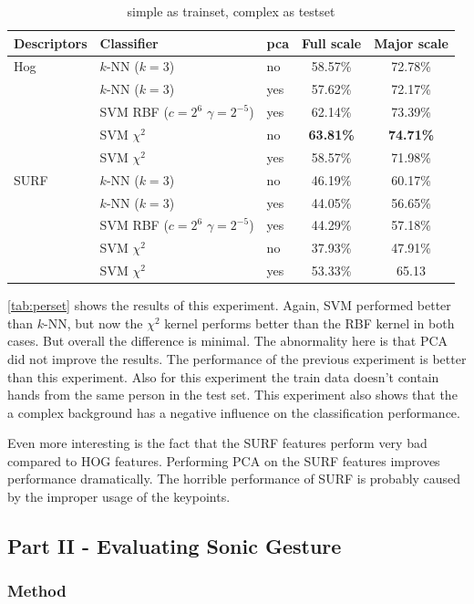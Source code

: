 \begin{table}
\centering
\begin{tabular}{lllcc}
\hline\hline
Descriptors & Classifier 		& pca		&  	Full scale	&	Major scale	\\
\hline
Hog & $k$-NN ($k=3$)& no	&	58.57\% 	&	72.78\%	\\
& $k$-NN ($k=3$)	& yes	&	57.62\% 	&	72.17\%	\\
& SVM RBF ($c=2^6$ $\gamma=2^{-5}$)			& yes & 62.14\%	&	73.39\%	\\
& SVM $\chi^2$ 		&	no	&	\textbf{63.81\%}		&	\textbf{74.71\%}\\
& SVM $\chi^2$		&	yes &	58.57\% 	&	71.98\% \\
\hline
SURF & $k$-NN ($k=3$)&	no	&	46.19\% 	&	60.17\%	\\
& $k$-NN ($k=3$)	&	yes &	44.05\%		& 56.65\% \\
& SVM RBF ($c=2^6$ $\gamma=2^{-5}$)			& yes &	44.29\%	&	57.18\%	\\
& SVM $\chi^2$		&	no	&	37.93\%		&	47.91\%	\\
& SVM $\chi^2$		&	yes	&	53.33\% 	&	65.13 \\
\hline
\end{tabular}
\caption{simple as trainset, complex as testset}
\label{tab:perset}
\end{table}

\autoref{tab:perset} shows the results of this experiment. Again, SVM performed better than $k$-NN, but now the $\chi^2$ kernel performs better than the RBF kernel in both cases. But overall the difference is minimal. The abnormality here is that PCA did not improve the results. The performance of the previous experiment is better than this experiment. Also for this experiment the train data doesn't contain hands from the same person in the test set. This experiment also shows that the a complex background has a negative influence on the classification performance. 

Even more interesting is the fact that the SURF features perform very bad compared to HOG features. Performing PCA on the SURF features improves performance dramatically. The horrible performance of SURF is probably caused by the improper usage of the keypoints.


\subsection{Part II - Evaluating Sonic Gesture}

\subsubsection{Method}

